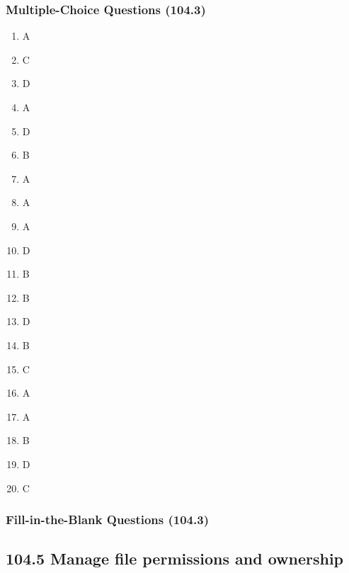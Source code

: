 \documentclass[a4paper]{report}
\begin{document}
\subsubsection*{Multiple-Choice Questions (104.3)}
\begin{enumerate}[1.]
    \item A
    \item C
    \item D
    \item A
    \item D
    \item B
    \item A
    \item A
    \item A
    \item D
    \item B
    \item B
    \item D
    \item B
    \item C
    \item A
    \item A
    \item B
    \item D
    \item C
\end{enumerate}

\subsubsection*{Fill-in-the-Blank Questions (104.3)}

\subsection*{104.5 Manage file permissions and ownership}
\end{document}

